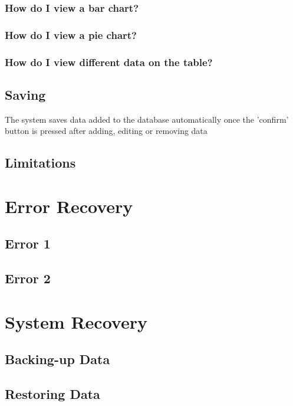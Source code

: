 \subsubsection{How do I view a bar chart?}

\subsubsection{How do I view a pie chart?}

\subsubsection{How do I view different data on the table?}

\subsection{Saving}
The system saves data added to the database automatically once the 'confirm' button is pressed after adding, editing or removing data

\subsection{Limitations}

\section{Error Recovery}

\subsection{Error 1}

\subsection{Error 2}

\section{System Recovery}

\subsection{Backing-up Data}

\subsection{Restoring Data}
